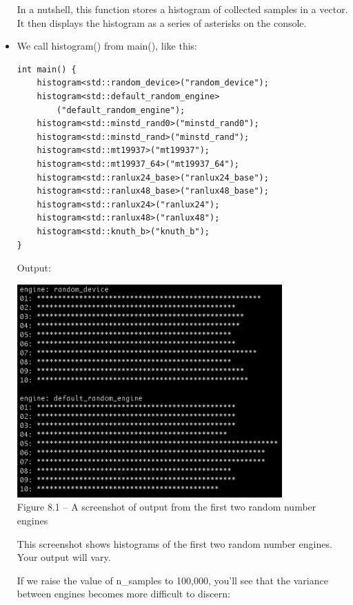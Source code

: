 \begin{itemize}
In a nutshell, this function stores a histogram of collected samples in a vector. It then displays the histogram as a series of asterisks on the console.

\item 
We call histogram() from main(), like this:

\begin{lstlisting}[style=styleCXX]
int main() {
	histogram<std::random_device>("random_device");
	histogram<std::default_random_engine>
		("default_random_engine");
	histogram<std::minstd_rand0>("minstd_rand0");
	histogram<std::minstd_rand>("minstd_rand");
	histogram<std::mt19937>("mt19937");
	histogram<std::mt19937_64>("mt19937_64");
	histogram<std::ranlux24_base>("ranlux24_base");
	histogram<std::ranlux48_base>("ranlux48_base");
	histogram<std::ranlux24>("ranlux24");
	histogram<std::ranlux48>("ranlux48");
	histogram<std::knuth_b>("knuth_b");
}
\end{lstlisting}

Output:

\begin{center}
\includegraphics[width=0.8\textwidth]{content/chapter8/images/1.png}\\
Figure 8.1 – A screenshot of output from the first two random number engines
\end{center}

This screenshot shows histograms of the first two random number engines. Your output will vary.

If we raise the value of n\_samples to 100,000, you'll see that the variance between engines becomes more difficult to discern:


\end{itemize}
